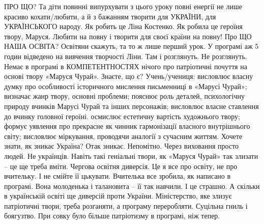 ПРО ЩО?
Та діти повинні випурхувати з цього уроку повні енергії не лише красиво кохати/любити, а й з бажанням творити для УКРАЇНИ, для УКРАЇНСЬКОГО народу. Як робить це Ліна Костенко. Як робила це героїня твору, Маруся. Любити на повну і творити для своєї країни на повну!
Про ЩО НАША ОСВІТА?
Освітяни скажуть, та то ж лише перший урок. У програмі аж 5 годин відведено на вивчення творчості Ліни. Там і розглянуть.
Не розглянуть. Немає в програмі в КОМПЕТЕНТНОСТЯХ нічого про патріотичні почуття на основі твору «Маруся Чурай». Знаєте, що є?
Учень/учениця:
висловлює власну думку про особливості історичного мислення письменниці в «Марусі Чурай»;
визначає жанр твору, основні проблеми;
пояснює роль деталей, психологічну природу вчинків Марусі Чурай та інших персонажів;
висловлює власне ставлення до вчинку головної героїні.
осмислює естетичну вартість художнього твору;
формує уявлення про прекрасне як чинник гармонізації власного внутрішнього світу;
висловлює міркування, проводячи аналогії з сучасним життям.
Хочете знати, як зникає Україна? Отак зникає. Непомітно. Через виховання просто людей. Не українців. Навіть такі геніальні твори, як «Маруся Чурай» так злизати – це ще треба вміти. Чергова освітня диверсія. Це я все про освіту, не про вчительку. І не смійте її цькувати. Вчителька все зробила, як написано в програмі. Вона молоденька і талановита – її так навчили. І це страшно. А скільки в українській освіті ще диверсій проти України.
Міністерство, яке злизує патріотичні твори, треба розганяти, а програму переробляти. Суцільна гниль і боягузтво. При совку було більше патріотизму в програмі, ніж тепер.
